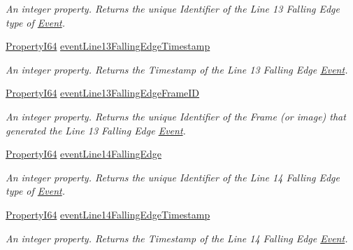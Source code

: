 \begin{DoxyCompactItemize}
\begin{DoxyCompactList}\small\item\em An integer property. Returns the unique Identifier of the Line 13 Falling Edge type of \hyperlink{classmv_i_m_p_a_c_t_1_1acquire_1_1_event}{Event}. \end{DoxyCompactList}\item 
\hyperlink{group___common_interface_ga81749b2696755513663492664a18a893}{Property\+I64} \hyperlink{classmv_i_m_p_a_c_t_1_1acquire_1_1_gen_i_cam_1_1_event_control_a917eced05fa7429c17f567bcf4810eb6}{event\+Line13\+Falling\+Edge\+Timestamp}
\begin{DoxyCompactList}\small\item\em An integer property. Returns the Timestamp of the Line 13 Falling Edge \hyperlink{classmv_i_m_p_a_c_t_1_1acquire_1_1_event}{Event}. \end{DoxyCompactList}\item 
\hyperlink{group___common_interface_ga81749b2696755513663492664a18a893}{Property\+I64} \hyperlink{classmv_i_m_p_a_c_t_1_1acquire_1_1_gen_i_cam_1_1_event_control_a96bb99b035c2888db3514dced832269a}{event\+Line13\+Falling\+Edge\+Frame\+I\+D}
\begin{DoxyCompactList}\small\item\em An integer property. Returns the unique Identifier of the Frame (or image) that generated the Line 13 Falling Edge \hyperlink{classmv_i_m_p_a_c_t_1_1acquire_1_1_event}{Event}. \end{DoxyCompactList}\item 
\hyperlink{group___common_interface_ga81749b2696755513663492664a18a893}{Property\+I64} \hyperlink{classmv_i_m_p_a_c_t_1_1acquire_1_1_gen_i_cam_1_1_event_control_a4e6240a1a74c5fc7daa234f1b61dd777}{event\+Line14\+Falling\+Edge}
\begin{DoxyCompactList}\small\item\em An integer property. Returns the unique Identifier of the Line 14 Falling Edge type of \hyperlink{classmv_i_m_p_a_c_t_1_1acquire_1_1_event}{Event}. \end{DoxyCompactList}\item 
\hyperlink{group___common_interface_ga81749b2696755513663492664a18a893}{Property\+I64} \hyperlink{classmv_i_m_p_a_c_t_1_1acquire_1_1_gen_i_cam_1_1_event_control_a6aad5cf0920f370f4077de311a844127}{event\+Line14\+Falling\+Edge\+Timestamp}
\begin{DoxyCompactList}\small\item\em An integer property. Returns the Timestamp of the Line 14 Falling Edge \hyperlink{classmv_i_m_p_a_c_t_1_1acquire_1_1_event}{Event}. \end{DoxyCompactList}\item 

\end{DoxyCompactItemize}

